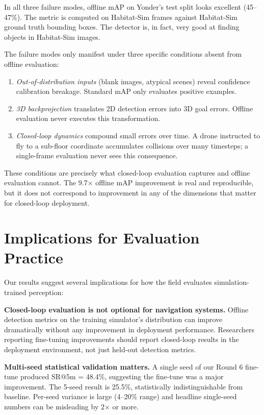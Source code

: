 \documentclass[conference]{IEEEtran}
\begin{document}
In all three failure modes, offline mAP on Yonder's test split looks excellent (45--47\%). The metric is computed on Habitat-Sim frames against Habitat-Sim ground truth bounding boxes. The detector is, in fact, very good at finding objects in Habitat-Sim images.

The failure modes only manifest under three specific conditions absent from offline evaluation:

\begin{enumerate}
\item \textit{Out-of-distribution inputs} (blank images, atypical scenes) reveal confidence calibration breakage. Standard mAP only evaluates positive examples.
\item \textit{3D backprojection} translates 2D detection errors into 3D goal errors. Offline evaluation never executes this transformation.
\item \textit{Closed-loop dynamics} compound small errors over time. A drone instructed to fly to a sub-floor coordinate accumulates collisions over many timesteps; a single-frame evaluation never sees this consequence.
\end{enumerate}

These conditions are precisely what closed-loop evaluation captures and offline evaluation cannot. The 9.7$\times$ offline mAP improvement is real and reproducible, but it does not correspond to improvement in any of the dimensions that matter for closed-loop deployment.

\section{Implications for Evaluation Practice}

Our results suggest several implications for how the field evaluates simulation-trained perception:

\textbf{Closed-loop evaluation is not optional for navigation systems.} Offline detection metrics on the training simulator's distribution can improve dramatically without any improvement in deployment performance. Researchers reporting fine-tuning improvements should report closed-loop results in the deployment environment, not just held-out detection metrics.

\textbf{Multi-seed statistical validation matters.} A single seed of our Round 6 fine-tune produced SR@5m = 48.4\%, suggesting the fine-tune was a major improvement. The 5-seed result is 25.5\%, statistically indistinguishable from baseline. Per-seed variance is large (4--20\% range) and headline single-seed numbers can be misleading by 2$\times$ or more.
\end{document}
